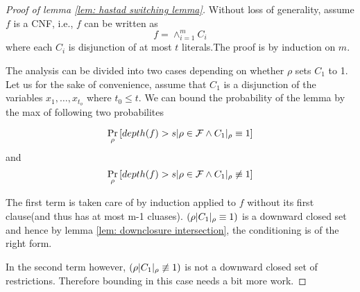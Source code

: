 \documentclass{article}
\newcommand{\calF}{\mathcal{F}}
\begin{document}
\begin{proof}[Proof of lemma \ref{lem: hastad switching lemma}]
	Without loss of generality, assume $f$ is a CNF, i.e., $f$ can be written as 
	$$f = \wedge_{i=1}^m C_i$$
	where each $C_i$ is disjunction of at most $t$ literals.The proof is by induction on $m$.        
		        
	The analysis can be divided into two cases depending on whether $\rho$ sets $C_1$ to 1. 
	Let us for the sake of convenience, assume that $C_1$ is a disjunction of the variables 
	$x_1,\ldots ,x_{t_o}$ where $t_0 \leq t$. We can bound the probability of the lemma by the max of 
	following two probabilites
		        
	\begin{equation}
		\label{eq: C1 equiv 1}
		\prob{\rho}{depth(f)>s|\rho \in \calF \wedge C_1|_\rho \equiv 1}
	\end{equation}
	and 
	\begin{equation}
		\label{eq: C_1 not equiv 1}
		\prob{\rho}{depth(f)>s|\rho \in \calF \wedge C_1|_\rho \not\equiv 1}
	\end{equation}
		        
    The first term is taken care of by induction applied to $f$ without its first clause(and thus has 
    at most m-1 cluases).  $\left(\rho| C_1|_\rho \equiv 1\right)$ is a downward closed set and hence by 
    lemma \ref{lem: downclosure intersection}, the conditioning is of the right form. 
		        
    In the second term however, $\left(\rho| C_1|_\rho \not\equiv 1\right)$ is not a downward closed set 
    of restrictions. Therefore bounding in this case needs a bit more work.  
                
    
\end{proof}
\end{document}
